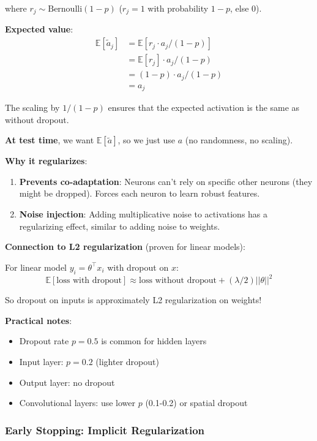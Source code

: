 \documentclass[11pt,oneside]{book}
\begin{document}
where $r_j \sim \text{Bernoulli}(1-p)$ ($r_j = 1$ with probability $1-p$, else 0).

\textbf{Expected value}:
\begin{align}
\mathbb{E}[\tilde{a}_j] &= \mathbb{E}[r_j \cdot a_j / (1-p)] \\
&= \mathbb{E}[r_j] \cdot a_j / (1-p) \\
&= (1-p) \cdot a_j / (1-p) \\
&= a_j
\end{align}

The scaling by $1/(1-p)$ ensures that the expected activation is the same as without dropout.

\textbf{At test time}, we want $\mathbb{E}[\tilde{a}]$, so we just use $a$ (no randomness, no scaling).

\textbf{Why it regularizes}:

\begin{enumerate}
    \item \textbf{Prevents co-adaptation}: Neurons can't rely on specific other neurons (they might be dropped). Forces each neuron to learn robust features.

    \item \textbf{Noise injection}: Adding multiplicative noise to activations has a regularizing effect, similar to adding noise to weights.
\end{enumerate}

\textbf{Connection to L2 regularization} (proven for linear models):

For linear model $y_i = \theta^\top x_i$ with dropout on $x$:
\begin{equation}
\mathbb{E}[\text{loss with dropout}] \approx \text{loss without dropout} + (\lambda/2)||\theta||^2
\end{equation}

So dropout on inputs is approximately L2 regularization on weights!

\textbf{Practical notes}:
\begin{itemize}
    \item Dropout rate $p = 0.5$ is common for hidden layers
    \item Input layer: $p = 0.2$ (lighter dropout)
    \item Output layer: no dropout
    \item Convolutional layers: use lower $p$ (0.1-0.2) or spatial dropout
\end{itemize}

\subsubsection{Early Stopping: Implicit Regularization}
\end{document}
